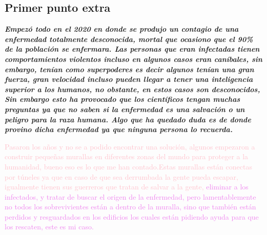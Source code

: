 \documentclass[letterpaper,12pt]{article}
\begin{document}
 \subsection{\Large {Primer punto extra}}
{\textit{\textbf{Empezó todo en el 2020 en donde se produjo un contagio de una enfermedad totalmente desconocida, mortal que ocasiono que el 90\% de la población se enfermara. Las personas que eran infectadas tienen comportamientos violentos incluso en algunos casos eran caníbales, sin embargo, tenían como superpoderes es decir algunos tenían una gran fuerza, gran velocidad incluso pueden llegar a tener una inteligencia superior a los humanos, no obstante, en estos casos son desconocidos, Sin embargo esto ha provocado que los científicos tengan muchas preguntas ya que no saben si la enfermedad es una salvación o un peligro para la raza humana. Algo que ha quedado duda es de donde provino dicha enfermedad ya que ninguna persona lo recuerda.}}}

\textcolor{pink}{Pasaron los años y no se a podido encontrar una solución, algunos empezaron a construir pequeñas murallas en diferentes zonas del mundo para proteger a la humanidad, bueno eso es lo que me han contado.Estas murallas están conectas por túneles ya que en caso de que sea derrumbada la gente pueda escapar, igualmente tienen sus guerreros que tratan de salvar a la gente,} \textcolor{violet}{eliminar a los infectados, y tratar de buscar el origen de la enfermedad, pero lamentablemente no todos los sobrevivientes están a dentro de la muralla, sino que también están perdidos y resguardados en los edificios los cuales están pidiendo ayuda para que los rescaten, este es mi caso.}
\end{document}
